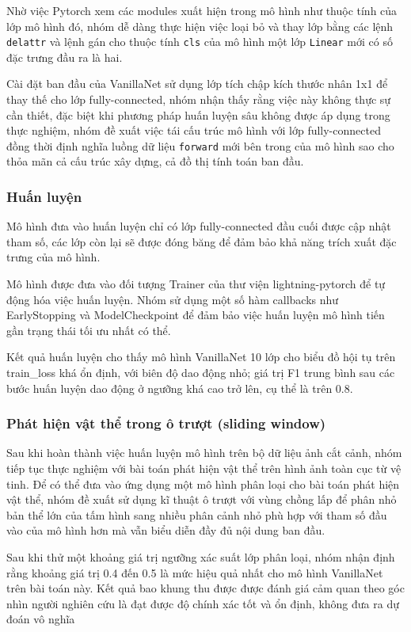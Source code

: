 \documentclass[a4paper,12pt]{article}
\begin{document}
Nhờ việc Pytorch xem các modules xuất hiện trong mô hình như thuộc tính của lớp mô hình đó, nhóm dễ dàng thực hiện việc loại bỏ và thay lớp bằng các lệnh \verb|delattr| và lệnh gán cho thuộc tính \verb|cls| của mô hình một lớp \verb|Linear| mới có số đặc trưng đầu ra là hai.

Cài đặt ban đầu của VanillaNet sử dụng lớp tích chập kích thước nhân 1x1 để thay thế cho lớp fully-connected, nhóm nhận thấy rằng việc này không thực sự cần thiết, đặc biệt khi phương pháp huấn luyện sâu không được áp dụng trong thực nghiệm, nhóm đề xuất việc tái cấu trúc mô hình với lớp fully-connected đồng thời định nghĩa luồng dữ liệu \verb|forward| mới bên trong của mô hình sao cho thỏa mãn cả cấu trúc xây dựng, cả đồ thị tính toán ban đầu.

\subsubsection{Huấn luyện}
Mô hình đưa vào huấn luyện chỉ có lớp fully-connected đầu cuối được cập nhật tham số, các lớp còn lại sẽ được đóng băng để đảm bảo khả năng trích xuất đặc trưng của mô hình.

Mô hình được đưa vào đối tượng Trainer của thư viện lightning-pytorch để tự động hóa việc huấn luyện. Nhóm sử dụng một số hàm callbacks như EarlyStopping và ModelCheckpoint để đảm bảo việc huấn luyện mô hình tiến gần trạng thái tối ưu nhất có thể.

Kết quả huấn luyện cho thấy mô hình VanillaNet 10 lớp cho biểu đồ hội tụ trên train\_loss khá ổn định, với biên độ dao động nhỏ; giá trị F1 trung bình sau các bước huấn luyện dao động ở ngưỡng khá cao trở lên, cụ thể là trên 0.8.

\subsubsection{Phát hiện vật thể trong ô trượt (sliding window)}
Sau khi hoàn thành việc huấn luyện mô hình trên bộ dữ liệu ảnh cắt cảnh, nhóm tiếp tục thực nghiệm với bài toán phát hiện vật thể trên hình ảnh toàn cục từ vệ tinh. Để có thể đưa vào ứng dụng một mô hình phân loại cho bài toán phát hiện vật thể, nhóm đề xuất sử dụng kĩ thuật ô trượt với vùng chồng lấp để phân nhỏ bản thể lớn của tấm hình sang nhiều phân cảnh nhỏ phù hợp với tham số đầu vào của mô hình hơn mà vẫn biểu diễn đầy đủ nội dung ban đầu.

Sau khi thử một khoảng giá trị ngưỡng xác suất lớp phân loại, nhóm nhận định rằng khoảng giá trị 0.4 đến 0.5 là mức hiệu quả nhất cho mô hình VanillaNet trên bài toán này. Kết quả bao khung thu được được đánh giá cảm quan theo góc nhìn người nghiên cứu là đạt được độ chính xác tốt và ổn định, không đưa ra dự đoán vô nghĩa
\end{document}

